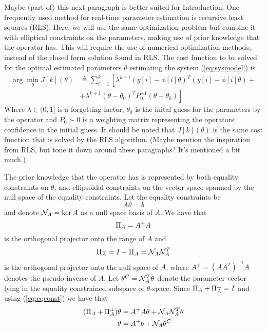 {\color{red}Maybe (part of) this next paragraph is better suited for Introduction.}
One frequently used method for real-time parameter estimation is recursive least squares
(RLS)\cite{astrom_adaptive_2008}. Here, we will use the same optimization problem but
combine it with elliptical constraints on the parameters, making use of prior knowledge
that the operator has. This will require the use of numerical optimization methods, instead 
of the closed form solution found in RLS. The cost function to be solved for the optimal
estimated parameters $\theta$ estimating the system (\ref{eq:sysmodel}) is
\begin{equation}
    \begin{split}
        \arg\min\limits_{\theta} J[k](\theta) &\triangleq
            \sum\limits_{i=1}^k \left[
            \lambda^{k-i}(y[i]-\phi[i]\theta)^T(y[i]-\phi[i]\theta) + \right.\\
            &+ \left. \lambda^{k+1}(\theta-\theta_0)^TP_0^{-1}(\theta-\theta_0) \right]
    \end{split}
    \label{eq:costfunction}
\end{equation}
Where $\lambda \in (0,1]$ is a forgetting factor, $\theta_0$
is the inital guess for the parameters
by the operator and $P_0 \succ 0$ is a weighting matrix representing the
operators confidence in the initial guess. It should be noted that 
$J[k](\theta)$ is the same cost function that is solved
by the RLS algorithm. \cite{islam_recursive_2019}
{\color{red}(Maybe mention the inspiration from RLS, but tone it down around these paragraphs? It's
mentioned a bit much.)}

The prior knowledge that the operator has is represented by both equality constraints
on $\theta$, and ellipsoidal constraints on the vector space spanned by the null space
of the equality constraints. Let the equality constraints be
\begin{equation}
    A\theta = b
    \label{eq:eqconst}
\end{equation}
and denote $\mathcal{N}_A=\ker A$ as a null space basis of $A$. We have that
\begin{equation}
    \Pi_A = A^+A
\end{equation}
is the orthogonal projector onto the range of $A$ and
\begin{equation}
    \Pi_A^\perp = I - \Pi_A = \mathcal{N}_A\mathcal{N}_A^T
\end{equation}
is the orthogonal projector onto the null space of $A$,
where $A^+ = (AA^T)^{-1}A$ denotes the pseudo inverse of $A$.
Let $\theta^C = \mathcal{N}_A^T\theta$ denote the parameter vector lying in the
equality constrained subspace of $\theta$-space. Since
$\Pi_A + \Pi_A^\perp = I$ and using (\ref{eq:eqconst}) we have that
\begin{align}
    (\Pi_A + \Pi_A^\perp)\theta &= A^+A\theta + \mathcal{N}_A\mathcal{N}_A^T\theta \notag \\
    \theta &= A^+b + \mathcal{N}_A\theta^C
    \label{eq:thetanull}
\end{align}

